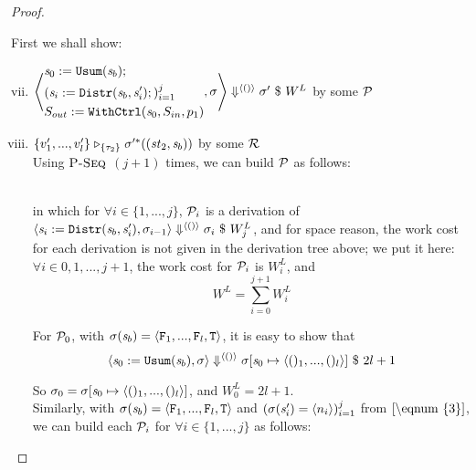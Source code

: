 \begin{proof}
\begin{itemize}
First we shall show: 
	\begin{enumerate}[(i)]
	\setcounter{enumi}{6}
	\item \label{comp-5} $\left\langle\begin{aligned} &\mathit{s}_0 := \mathtt{Usum}(\mathit{s}_b); \\ &(\mathit{s}_i := \mathtt{Distr}(\mathit{s}_b,\mathit{s}_i');)^j_{i=1} \\ &S_{out} := \mathtt{WithCtrl}(\mathit{s}_0,S_{in},p_1) \end{aligned},\sigma \right\rangle \Downarrow^{\langle () \rangle} \sigma' \ \$ \ W^L$
	by some $\mathcal{P}$
	\item $\{ v'_1,...,v'_l \} \mathrel{\triangleright_{\{\tau_2\}}} \sigma'^*((\mathit{st}_2,\mathit{s}_b))$ by some $\mathcal{R}$ \\

Using $\textsc{P-Seq}$ $(j+1)$ times, we can build $\mathcal{P}$ as follows:

{\normalsize
{}}\\

 in which for $\forall i \in \{1,...,j\}$, $\mathcal{P}_i$ is a derivation of  $\left\langle\mathit{s}_i := \mathtt{Distr}(\mathit{s}_b,\mathit{s}_i'),\sigma_{i-1} \right\rangle \Downarrow^{\langle () \rangle} \sigma_{i} \ \$ \ W^L_j$,
 and for space reason, the work cost for each derivation is not given in the derivation tree above; we put it here: $\forall i \in {0,1,...,j+1}$, the work cost for $\mathcal{P}_i$ is $W^L_i$,
 and $$W^L = \sum_{i=0}^{j+1} W^L_i$$
 

 
  For $\mathcal{P}_0$, with $\sgm(\s_b) = \stwo$, it is easy to show that
  $$\seval{\usumdef}{\sgm}{\vunit}{\sgm[\s_0 \|-> \lunit]}{2l+1}$$
  

    So $\sgm_0 = \sgm[\s_0 \|-> \lunit]$, and $W^L_0 = 2l+1$.\\

	Similarly, with  $\sgm(\s_b) = \stwo$ and $(\sigma(\mathit{s}_i') = \langle n_i \rangle)^j_{i=1}$ from $\eqref{\eqnum{3}}$, we can build each $\mathcal{P}_i$ for 
	$\forall i \in \{1,...,j\}$ as follows:\\
	
  

\end{enumerate}
\end{itemize}
\end{proof}
